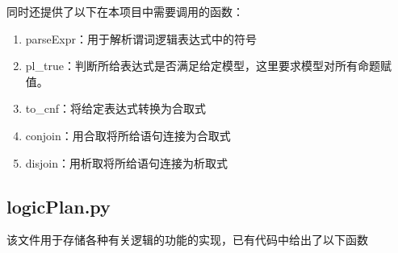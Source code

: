 同时还提供了以下在本项目中需要调用的函数：
\begin{enumerate}
    \item parseExpr：用于解析谓词逻辑表达式中的符号
    \item pl\_true：判断所给表达式是否满足给定模型，这里要求模型对所有命题赋值。
    \item to\_cnf：将给定表达式转换为合取式
    \item conjoin：用合取将所给语句连接为合取式
    \item disjoin：用析取将所给语句连接为析取式
\end{enumerate}
\subsection{logicPlan.py}
该文件用于存储各种有关逻辑的功能的实现，已有代码中给出了以下函数

